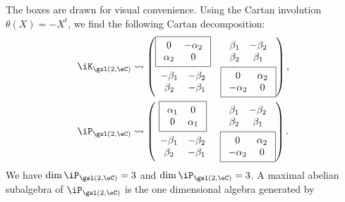 The boxes are drawn for visual convenience.  Using the Cartan involution $\theta(X)=-X^t$, we find the following Cartan decomposition:
\begin{equation}
	\begin{split}
		\iK_{\gsl(2,\eC)} & \leadsto
		\begin{pmatrix}
			\boxed{
				\begin{array}{cc}
					0        & -\alpha_2 \\
					\alpha_2 & 0
				\end{array}
			}                      &
			\begin{array}{cc}
				\beta_1 & -\beta_2 \\
				\beta_2 & \beta_1
			\end{array}       \\
			\begin{array}{cc}
				-\beta_1 & -\beta_2 \\
				\beta_2  & -\beta_1
			\end{array} &
			\boxed{
				\begin{array}{cc}
					0         & \alpha_2 \\
					-\alpha_2 & 0
				\end{array}
			}
		\end{pmatrix}, \\
		\iP_{\gsl(2,\eC)} & \leadsto
		\begin{pmatrix}
			\boxed{
				\begin{array}{cc}
					\alpha_1 & 0        \\
					0        & \alpha_1
				\end{array}
			}                      &
			\begin{array}{cc}
				\beta_1 & -\beta_2 \\
				\beta_2 & \beta_1
			\end{array}       \\
			\begin{array}{cc}
				-\beta_1 & -\beta_2 \\
				\beta_2  & -\beta_1
			\end{array} &
			\boxed{
				\begin{array}{cc}
					0         & \alpha_2 \\
					-\alpha_2 & 0
				\end{array}
			}
		\end{pmatrix}.
	\end{split}
\end{equation}
We have $\dim\iP_{\gsl(2,\eC)}=3$ and $\dim\iP_{\gsl(2,\eC)}=3$. A maximal abelian subalgebra of $\iP_{\gsl(2,\eC)}$ is the one dimensional algebra generated by

